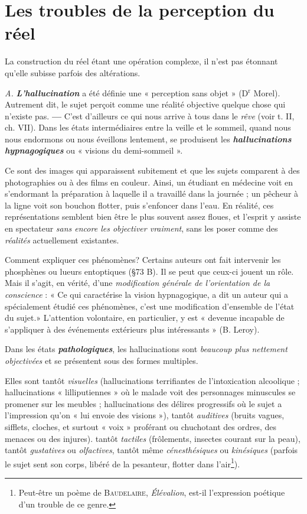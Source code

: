 \section{Les troubles de la perception du réel}%
La construction du réel étant une opération complexe, il n’est pas étonnant
qu’elle subisse parfois des altérations.

{\it A.} \textbf{\textit {L'hallucination}} a été définie une « perception sans objet »
(D$^\text{r}$ Morel). Autrement dit, le sujet perçoit comme une réalité objective
quelque chose qui n’existe pas. {\bf —} C’est d’ailleurs ce qui nous
arrive à tous dans le {\it rêve} (voir t. II, ch. VII). Dans les états intermédiaires
entre la veille et le sommeil, quand nous nous endormons ou
nous éveillons lentement, se produisent les \textbf{\textit {hallucinations hypnagogiques}}
ou « visions du demi-sommeil ».

Ce sont des images qui apparaissent subitement et que les sujets comparent
à des photographies ou à des films en couleur. Ainsi, un étudiant en
médecine voit en s’endormant la préparation à laquelle il a travaillé dans la
journée ; un pêcheur à la ligne voit son bouchon flotter, puis s’enfoncer
dans l’eau. En réalité, ces représentations semblent bien être le plus souvent
assez floues, et l'esprit y assiste en spectateur {\it sans encore les objectiver
vraiment}, sans les poser comme des {\it réalités} actuellement existantes.

Comment expliquer ces phénomènes? Certains auteurs ont fait
intervenir les phosphènes ou lueurs entoptiques (\S 73 B). Il se peut
que ceux-ci jouent un rôle. Mais il s’agit, en vérité, d’une {\it modification
générale de l'orientation de la conscience} : « Ce qui caractérise la vision
hypnagogique, a dit un auteur qui a spécialement étudié ces phénomènes,
c’est une modification d’ensemble de l’état du sujet.» L’attention
volontaire, en particulier, y est « devenue incapable de s’appliquer
à des événements extérieurs plus intéressants » (B. Leroy).

Dans les états \textbf{\textit {pathologiques}}, les hallucinations sont {\it beaucoup
plus nettement objectivées} et se présentent sous des formes multiples.

Elles sont tantôt {\it visuelles} (hallucinations terrifiantes de l’intoxication
alcoolique ; hallucinations « lilliputiennes » où le malade voit des personnages
minuscules se promener sur les meubles ; hallucinations des délires
progressifs où le sujet a l'impression qu’on « lui envoie des visions »), tantôt {\it
auditives} (bruits vagues, sifflets, cloches, et surtout « voix » proférant ou
chuchotant des ordres, des menaces ou des injures). tantôt {\it tactiles} (frôlements,
insectes courant sur la peau), tantôt {\it gustatives} ou {\it olfactives}, tantôt
même {\it cénesthésiques} ou {\it kinésiques} (parfois le sujet sent son corps, libéré
de la pesanteur, flotter dans l’air\footnote{Peut-être un poème de \textsc{Baudelaire}, {\it Élévalion}, est-il l'expression poétique d’un
trouble de ce genre.}).

